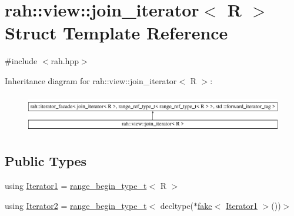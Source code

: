 \hypertarget{structrah_1_1view_1_1join__iterator}{}\section{rah\+::view\+::join\+\_\+iterator$<$ R $>$ Struct Template Reference}
\label{structrah_1_1view_1_1join__iterator}


{\ttfamily \#include $<$rah.\+hpp$>$}

Inheritance diagram for rah\+::view\+::join\+\_\+iterator$<$ R $>$\+:\begin{figure}[H]
\begin{center}
\leavevmode
\includegraphics[height=1.686747cm]{structrah_1_1view_1_1join__iterator}
\end{center}
\end{figure}
\subsection*{Public Types}
\begin{DoxyCompactItemize}
\item 
using \mbox{\hyperlink{structrah_1_1view_1_1join__iterator_a8b71c6f25eee2915e2a8afc6e024196d}{Iterator1}} = \mbox{\hyperlink{namespacerah_a28aff4eeddcece6be65ff0b956d32d4a}{range\+\_\+begin\+\_\+type\+\_\+t}}$<$ R $>$
\item 
using \mbox{\hyperlink{structrah_1_1view_1_1join__iterator_ae03a066174f3422c70d0e3c22e68d9f7}{Iterator2}} = \mbox{\hyperlink{namespacerah_a28aff4eeddcece6be65ff0b956d32d4a}{range\+\_\+begin\+\_\+type\+\_\+t}}$<$ decltype($\ast$\mbox{\hyperlink{namespacerah_a11785bbdf970efa1bc57fc14993b77bf}{fake}}$<$ \mbox{\hyperlink{structrah_1_1view_1_1join__iterator_a8b71c6f25eee2915e2a8afc6e024196d}{Iterator1}} $>$())$>$
\end{DoxyCompactItemize}
